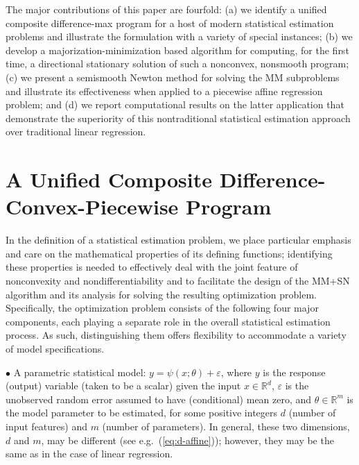 \documentclass{siamart}
\begin{document}
The major contributions of this paper are fourfold: (a) we identify a unified composite difference-max program for a host of
modern statistical estimation problems and illustrate the formulation with a variety of special instances; (b) we develop a
majorization-minimization based algorithm for computing, for the first time, a directional stationary solution of such a
nonconvex, nonsmooth program; %
(c) we present a semismooth Newton method for solving the MM subproblems and illustrate its effectiveness when
applied to a piecewise affine regression problem; and (d) we report computational results on the latter application that
demonstrate the superiority of this nontraditional statistical estimation approach over traditional linear regression.


\section{A Unified Composite Difference-Convex-Piecewise Program}

In the definition of a statistical estimation problem, we place particular emphasis and care
on the mathematical properties of its defining functions; identifying these properties is needed to
effectively deal with the joint feature of nonconvexity and nondifferentiability and to facilitate the design
of the MM+SN algorithm and its analysis for solving the resulting optimization problem.
Specifically, the optimization problem consists of the following four major components, each playing a separate
role in the overall statistical estimation process.  As such, distinguishing them offers flexibility to accommodate
a variety of model specifications.

$\bullet $ A parametric statistical model: $y = \psi(x; \theta) + \varepsilon$, where $y$ is the response (output) variable
(taken to be a scalar) given the input $x \in  \mathbb{R}^d$, $\varepsilon$ is the unobserved random error assumed to have (conditional) mean zero, and $\theta \in  \mathbb{R}^m$ is the model parameter to be estimated,
for some positive integers $d$ (number of input features) and $m$ (number of parameters). In general, these two dimensions, $d$ and $m$, may be different (see e.g.\ (\ref{eq:d-affine})); however, they may be the same as in the case of linear regression.
\end{document}
